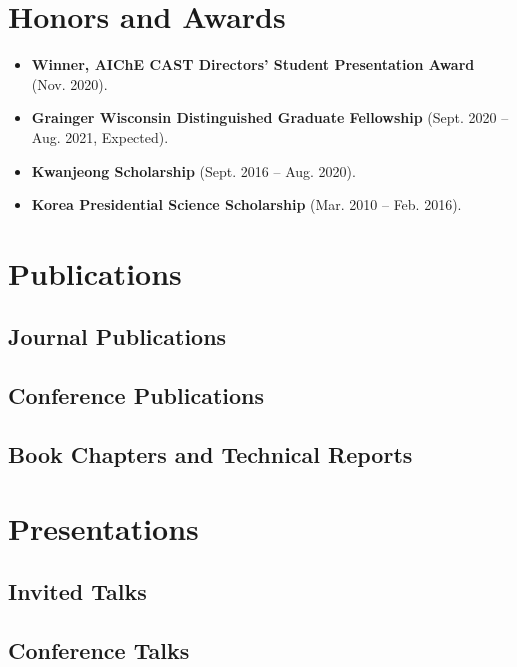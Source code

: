 \documentclass{article}
\begin{document}
\section*{Honors and Awards}
\begin{itemize}[leftmargin=*]
\item[] {\bf Winner, AIChE CAST Directors' Student Presentation Award} (Nov. 2020).
\item[] {\bf Grainger Wisconsin Distinguished Graduate Fellowship} (Sept. 2020 -- Aug. 2021, Expected).
\item[] {\bf Kwanjeong Scholarship} (Sept. 2016 -- Aug. 2020).
\item[] {\bf Korea Presidential Science Scholarship} (Mar. 2010 -- Feb. 2016).
\end{itemize}

\section*{Publications}
\subsection*{Journal Publications}
\renewcommand*{\labelenumi}{[J\theenumi]}
\subsection*{Conference Publications}
\renewcommand*{\labelenumi}{[C\theenumi]}
\subsection*{Book Chapters and Technical Reports}
\renewcommand*{\labelenumi}{[B\theenumi]}

\section*{Presentations}
\subsection*{Invited Talks}
\renewcommand*{\labelenumi}{[I\theenumi]}
\subsection*{Conference Talks}
\renewcommand*{\labelenumi}{[P\theenumi]}
\end{document}
